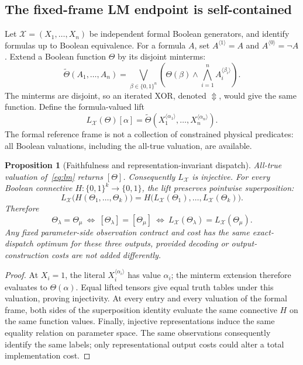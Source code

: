 \documentclass[11pt]{article}
\newtheorem{proposition}[theorem]{Proposition}
\theoremstyle{definition}
\theoremstyle{remark}
\newcommand{\B}{\{0,1\}}
\newcommand{\CM}[1]{[#1]}
\newcommand{\fr}{\mathcal X}
\begin{document}
\subsection{The fixed-frame LM endpoint is self-contained}
Let $\fr=(X_1,\ldots,X_n)$ be independent formal Boolean generators, and identify formulas up to Boolean equivalence. For a formula $A$, set $A^{\langle1\rangle}=A$ and $A^{\langle0\rangle}=\neg A$. Extend a Boolean function $\Theta$ by its disjoint minterms:
\[
 \widetilde\Theta(A_1,\ldots,A_n)
 =\bigvee_{\beta\in\B^n}
  \left(\Theta(\beta)\wedge\bigwedge_{i=1}^n A_i^{\langle\beta_i\rangle}\right).
\]
The minterms are disjoint, so an iterated XOR, denoted $\Updownarrow$, would give the same function. Define the formula-valued lift
\begin{equation}\label{eq:lm}
 L_{\fr}(\Theta)[\alpha]
 =\widetilde\Theta(X_1^{\langle\alpha_1\rangle},\ldots,X_n^{\langle\alpha_n\rangle}).
\end{equation}
The formal reference frame is not a collection of constrained physical predicates: all Boolean valuations, including the all-true valuation, are available.

\begin{proposition}[Faithfulness and representation-invariant dispatch]\label{prop:lift}
All-true valuation of~\eqref{eq:lm} returns $\CM{\Theta}$. Consequently $L_{\fr}$ is injective. For every Boolean connective $H:\B^k\to\B$, the lift preserves pointwise superposition:
\[
 L_{\fr}\bigl(H(\Theta_1,\ldots,\Theta_k)\bigr)
 =H\bigl(L_{\fr}(\Theta_1),\ldots,L_{\fr}(\Theta_k)\bigr).
\]
Therefore
\[
 \Theta_\lambda=\Theta_\mu
 \ \Longleftrightarrow\
 \CM{\Theta_\lambda}=\CM{\Theta_\mu}
 \ \Longleftrightarrow\
 L_{\fr}(\Theta_\lambda)=L_{\fr}(\Theta_\mu).
\]
Any fixed parameter-side observation contract and cost has the same exact-dispatch optimum for these three outputs, provided decoding or output-construction costs are not added differently.
\end{proposition}
\begin{proof}
At $X_i=1$, the literal $X_i^{\langle\alpha_i\rangle}$ has value $\alpha_i$; the minterm extension therefore evaluates to $\Theta(\alpha)$. Equal lifted tensors give equal truth tables under this valuation, proving injectivity. At every entry and every valuation of the formal frame, both sides of the superposition identity evaluate the same connective $H$ on the same function values. Finally, injective representations induce the same equality relation on parameter space. The same observations consequently identify the same labels; only representational output costs could alter a total implementation cost.
\end{proof}
\end{document}
